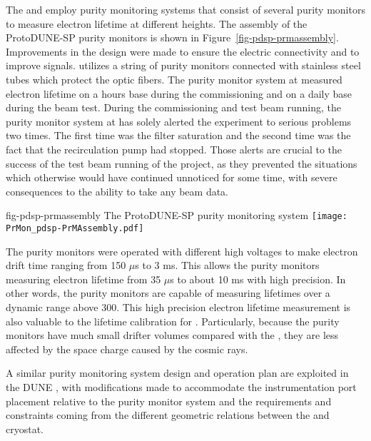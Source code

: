 The  and  employ purity monitoring systems that consist of several purity monitors to measure electron lifetime at different heights. The assembly of the ProtoDUNE-SP purity monitors is shown in Figure~\ref{fig-pdsp-prmassembly}. Improvements in the design were made to ensure the electric connectivity and to improve signals.  utilizes a string of purity monitors connected with stainless steel tubes which protect the optic fibers. The purity monitor system at  measured electron lifetime on a hours base during the commissioning and on a daily base during the beam test. During the commissioning and test beam running, the purity monitor system at  has solely alerted the experiment to serious problems two times. The first time was the filter saturation and the second time was the fact that the recirculation pump had stopped. Those alerts are crucial to the success of the test beam running of the  project, as they prevented the situations which otherwise would have continued unnoticed for some time, with severe consequences to the ability to take any beam data.

\begin{dunefigure}{fig-pdsp-prmassembly}
  {The ProtoDUNE-SP purity monitoring system}
  \texttt{[image: PrMon\_pdsp-PrMAssembly.pdf]}
\end{dunefigure}



The   purity monitors were operated with different high voltages to make electron drift time ranging from 150 $\mu$s to 3 ms. This allows the  purity monitors measuring electron lifetime from 35 $\mu$s to about 10 ms with high precision. In other words, the purity monitors are capable of measuring lifetimes over a dynamic range above 300. This high precision electron lifetime measurement is also valuable to the lifetime calibration for  . Particularly, because the purity monitors have much small drifter volumes compared with the , they are less affected by the space charge caused by the cosmic rays. 

  A similar purity monitoring system design and operation plan are exploited in the DUNE , with modifications made to accommodate the instrumentation port placement relative to the purity monitor system and the requirements and constraints coming from the different geometric relations between the  and cryostat.




